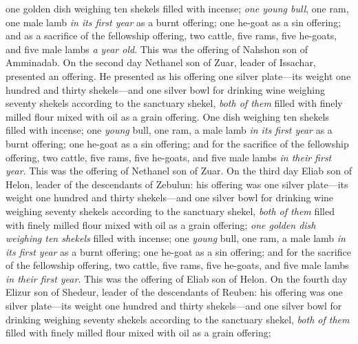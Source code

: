\begin{biblechapter}
\verse one golden dish weighing ten shekels filled with incense;
\verse \textit{one young bull}, one ram, one male lamb \textit{in its first year} as a burnt offering;
\verse one he-goat as a sin offering;
\verse and as a sacrifice of the fellowship offering, two cattle, five rams, five he-goats, and five male lambs \textit{a year old}. This was the offering of Nahshon son of Amminadab.
\verse On the second day Nethanel son of Zuar, leader of Issachar, presented an offering.
\verse He presented as his offering one silver plate—its weight one hundred and thirty shekels—and one silver bowl for drinking wine weighing seventy shekels according to the sanctuary shekel, \textit{both of them} filled with finely milled flour mixed with oil as a grain offering.
\verse One dish weighing ten shekels filled with incense;
\verse one \textit{young } bull, one ram, a male lamb \textit{in its first year} as a burnt offering;
\verse one he-goat as a sin offering;
\verse and for the sacrifice of the fellowship offering, two cattle, five rams, five he-goats, and five male lambs \textit{in their first year}. This was the offering of Nethanel son of Zuar.
\verse On the third day Eliab son of Helon, leader of the descendants of Zebulun:
\verse his offering was one silver plate—its weight one hundred and thirty shekels—and one silver bowl for drinking wine weighing seventy shekels according to the sanctuary shekel, \textit{both of them} filled with finely milled flour mixed with oil as a grain offering;
\verse \textit{one golden dish weighing ten shekels} filled with incense;
\verse one \textit{young} bull, one ram, a male lamb \textit{in its first year} as a burnt offering;
\verse one he-goat as a sin offering;
\verse and for the sacrifice of the fellowship offering, two cattle, five rams, five he-goats, and five male lambs \textit{in their first year}. This was the offering of Eliab son of Helon.
\verse On the fourth day Elizur son of Shedeur, leader of the descendants of Reuben:
\verse his offering was one silver plate—its weight one hundred and thirty shekels—and one silver bowl for drinking weighing seventy shekels according to the sanctuary shekel, \textit{both of them} filled with finely milled flour mixed with oil as a grain offering;

\end{biblechapter}
